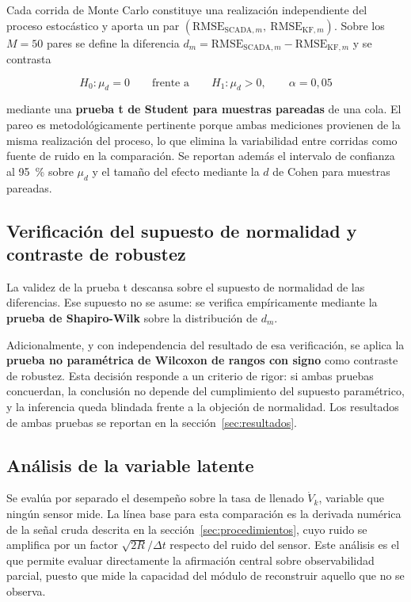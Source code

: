 Cada corrida de Monte Carlo constituye una realización independiente del proceso
estocástico y aporta un par $(\mathrm{RMSE}_{\text{SCADA},m},\
\mathrm{RMSE}_{\text{KF},m})$. Sobre los $M = 50$ pares se define la diferencia
$d_{m} = \mathrm{RMSE}_{\text{SCADA},m} - \mathrm{RMSE}_{\text{KF},m}$ y se
contrasta

\begin{equation}
H_{0}: \mu_{d} = 0 \qquad \text{frente a} \qquad H_{1}: \mu_{d} > 0,
\qquad \alpha = 0{,}05
\label{eq:hipotesis}
\end{equation}

mediante una \textbf{prueba t de Student para muestras pareadas} de una cola. El
pareo es metodológicamente pertinente porque ambas mediciones provienen de la
misma realización del proceso, lo que elimina la variabilidad entre corridas
como fuente de ruido en la comparación. Se reportan además el intervalo de
confianza al \SI{95}{\percent} sobre $\mu_{d}$ y el tamaño del efecto mediante
la $d$ de Cohen para muestras pareadas.

\subsection{Verificación del supuesto de normalidad y contraste de robustez}

La validez de la prueba t descansa sobre el supuesto de normalidad de las
diferencias. Ese supuesto no se asume: se verifica empíricamente mediante la
\textbf{prueba de Shapiro-Wilk} sobre la distribución de $d_{m}$.

Adicionalmente, y con independencia del resultado de esa verificación, se aplica
la \textbf{prueba no paramétrica de Wilcoxon de rangos con signo} como contraste
de robustez. Esta decisión responde a un criterio de rigor: si ambas pruebas
concuerdan, la conclusión no depende del cumplimiento del supuesto paramétrico,
y la inferencia queda blindada frente a la objeción de normalidad. Los
resultados de ambas pruebas se reportan en la sección~\ref{sec:resultados}.

\subsection{Análisis de la variable latente}

Se evalúa por separado el desempeño sobre la tasa de llenado $\dot{V}_{k}$,
variable que ningún sensor mide. La línea base para esta comparación es la
derivada numérica de la señal cruda descrita en la
sección~\ref{sec:procedimientos}, cuyo ruido se amplifica por un factor
$\sqrt{2R}/\Delta t$ respecto del ruido del sensor. Este análisis es el que
permite evaluar directamente la afirmación central sobre observabilidad parcial,
puesto que mide la capacidad del módulo de reconstruir aquello que no se observa.

